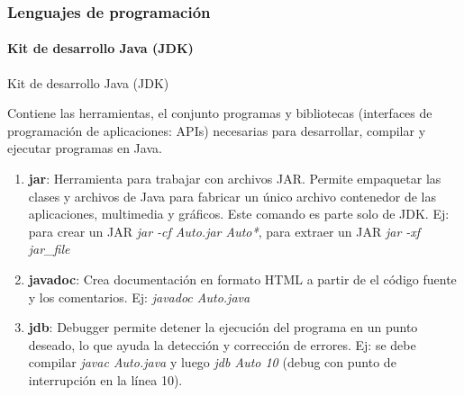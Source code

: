 \documentclass{beamer}
\begin{document}
		\begin{frame}
			\frametitle{Lenguajes de programaci\'on}
			\framesubtitle{Kit de desarrollo Java (JDK)}

			\begin{exampleblock}{Kit de desarrollo Java (JDK)}
				{\scriptsize
				Contiene las herramientas, el conjunto programas y bibliotecas (interfaces de programaci\'on de aplicaciones: APIs) necesarias para desarrollar, compilar y ejecutar programas en Java. 
				\begin{enumerate}
					\item \textbf{jar}: Herramienta para trabajar con archivos JAR. Permite empaquetar las clases y archivos de Java para fabricar un \'unico archivo contenedor de las aplicaciones, multimedia y
gr\'aficos.  Este comando es parte solo de JDK. Ej: para crear un JAR \emph{jar -cf Auto.jar Auto*}, para extraer un JAR \emph{jar -xf jar\_file}
					\item \textbf{javadoc}: Crea documentaci\'on en formato HTML a partir de el c\'odigo fuente y los comentarios. Ej: \emph{javadoc Auto.java}
					\item \textbf{jdb}: Debugger permite detener la ejecuci\'on del programa en un punto deseado, lo que ayuda la detecci\'on y correcci\'on de errores. Ej: se debe compilar \emph{javac Auto.java} y luego \emph{jdb Auto 10} (debug con punto de interrupci\'on en la l\'inea 10).
				\end{enumerate}
				}
			\end{exampleblock}
		\end{frame}
\end{document}
